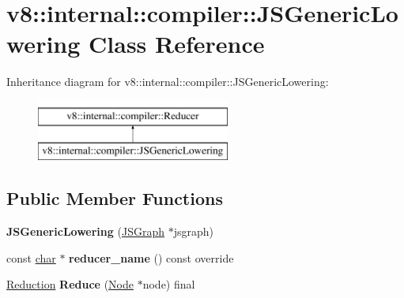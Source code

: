 \hypertarget{classv8_1_1internal_1_1compiler_1_1JSGenericLowering}{}\section{v8\+:\+:internal\+:\+:compiler\+:\+:J\+S\+Generic\+Lowering Class Reference}
\label{classv8_1_1internal_1_1compiler_1_1JSGenericLowering}
Inheritance diagram for v8\+:\+:internal\+:\+:compiler\+:\+:J\+S\+Generic\+Lowering\+:\begin{figure}[H]
\begin{center}
\leavevmode
\includegraphics[height=2.000000cm]{classv8_1_1internal_1_1compiler_1_1JSGenericLowering}
\end{center}
\end{figure}
\subsection*{Public Member Functions}
\begin{DoxyCompactItemize}
\item 
\mbox{\label{classv8_1_1internal_1_1compiler_1_1JSGenericLowering_a552d4825556008510a077e0bae7ddc42}} 
{\bfseries J\+S\+Generic\+Lowering} (\mbox{\hyperlink{classv8_1_1internal_1_1compiler_1_1JSGraph}{J\+S\+Graph}} $\ast$jsgraph)
\item 
\mbox{\label{classv8_1_1internal_1_1compiler_1_1JSGenericLowering_a5d144492fb1855ec9e23b13cc378c5ee}} 
const \mbox{\hyperlink{classchar}{char}} $\ast$ {\bfseries reducer\+\_\+name} () const override
\item 
\mbox{\label{classv8_1_1internal_1_1compiler_1_1JSGenericLowering_a38f11f925a0f2e2bcea3fb61c6e6514b}} 
\mbox{\hyperlink{classv8_1_1internal_1_1compiler_1_1Reduction}{Reduction}} {\bfseries Reduce} (\mbox{\hyperlink{classv8_1_1internal_1_1compiler_1_1Node}{Node}} $\ast$node) final
\end{DoxyCompactItemize}

